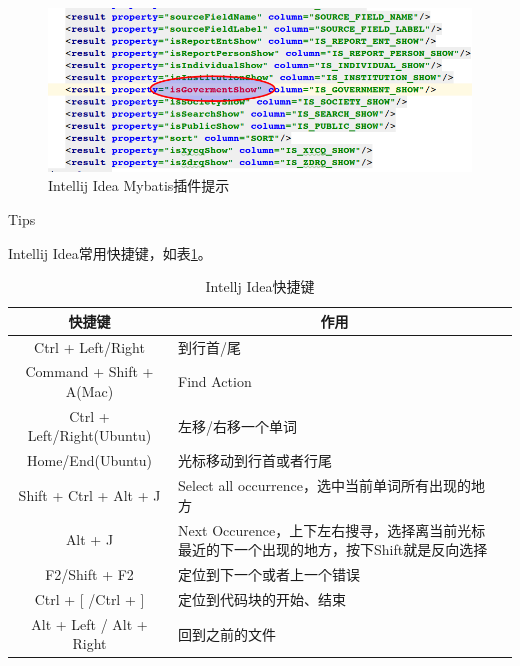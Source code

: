 \documentclass[12pt]{book}
\makeatletter
\numberwithin{dummy}{section}
\theoremstyle{ocrenumbox}
\theoremstyle{blacknumex}
\theoremstyle{blacknumbox}
\theoremstyle{ocrenum}
\renewcommand{\subsection}{\@startsection {subsection}{2}{\z@}
	{-3ex \@plus -0.1ex \@minus -.4ex}
	{0.5ex \@plus.2ex }
	{\normalfont\sffamily\bfseries}}
\makeatother
\begin{document}
\begin{figure}[htbp]
	\centering
	\includegraphics[scale=0.45]{intellijideapluginxmltips.png}
	\caption{Intellij Idea Mybatis插件提示}
	\label{fig:intellijideapluginxmltips}
\end{figure}



\subsection{Tips}


Intellij Idea常用快捷键，如表\ref{table:intellijideashortkeys}。

\begin{table}
	\begin{center}
		\caption{Intellj Idea快捷键}
		\bigskip
		\label{table:intellijideashortkeys}
		\begin{tabular}{cp{8cm}c}
			\hline
			\multirow{1}{*}{快捷键}
			& \multicolumn{1}{c}{作用}  \\
			\hline			
			Ctrl + Left/Right & 到行首/尾 \\
			Command + Shift + A(Mac) & Find Action \\
			Ctrl + Left/Right(Ubuntu) & 左移/右移一个单词\\
			Home/End(Ubuntu) & 光标移动到行首或者行尾\\
			Shift + Ctrl + Alt + J & Select all occurrence，选中当前单词所有出现的地方\\
			Alt + J & Next Occurence，上下左右搜寻，选择离当前光标最近的下一个出现的地方，按下Shift就是反向选择\\	
			F2/Shift + F2 & 定位到下一个或者上一个错误 \\
			Ctrl + [ /Ctrl + ] & 定位到代码块的开始、结束 \\
			Alt + Left / Alt + Right & 回到之前的文件\\
			\hline
		\end{tabular}
	\end{center}
\end{table}
\end{document}
